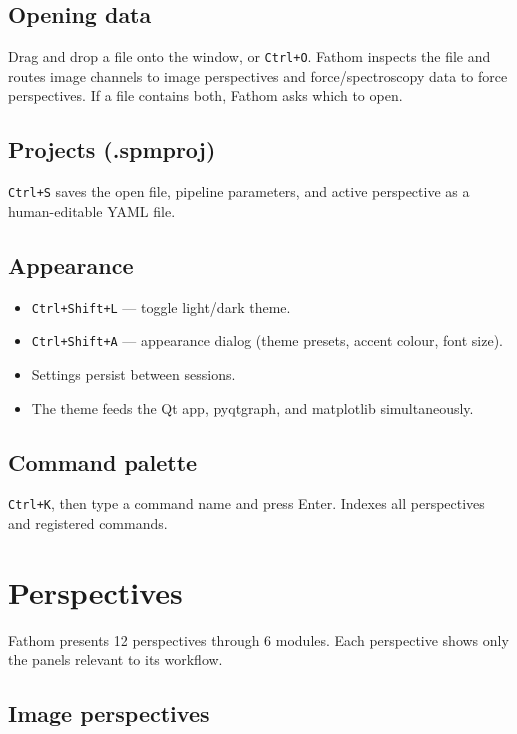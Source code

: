 \documentclass[a4paper,11pt]{article}
\begin{document}
\subsection{Opening data}
Drag and drop a file onto the window, or \texttt{Ctrl+O}. Fathom inspects the file and
routes image channels to image perspectives and force/spectroscopy data to force perspectives.
If a file contains both, Fathom asks which to open.

\subsection{Projects (.spmproj)}
\texttt{Ctrl+S} saves the open file, pipeline parameters, and active perspective as a
human-editable YAML file.

\subsection{Appearance}
\begin{itemize}[nosep]
  \item \texttt{Ctrl+Shift+L} --- toggle light/dark theme.
  \item \texttt{Ctrl+Shift+A} --- appearance dialog (theme presets, accent colour, font size).
  \item Settings persist between sessions.
  \item The theme feeds the Qt app, pyqtgraph, and matplotlib simultaneously.
\end{itemize}

\subsection{Command palette}
\texttt{Ctrl+K}, then type a command name and press Enter. Indexes all perspectives and
registered commands.

\section{Perspectives}

Fathom presents 12 perspectives through 6 modules. Each perspective shows only the
panels relevant to its workflow.

\subsection{Image perspectives}
\end{document}
